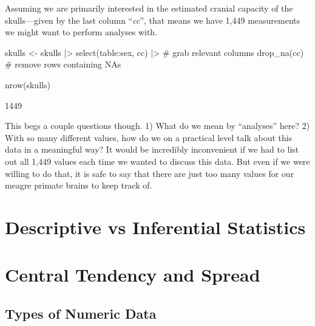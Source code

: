 

Assuming we are primarily interested in the estimated cranial capacity of the skulls—given by the last column ``\textit{cc}'', that means we have  1,449 measurements we might want to perform analyses with.

\begin{inR}
skulls <- skulls |> 
  select(table:sex, cc) |> # grab relevant columns
  drop_na(cc) # remove rows containing NAs
  
nrow(skulls)
\end{inR}

\begin{outR}
[1] 1449
\end{outR}

\noindent
This begs a couple questions though. 1) What do we mean by ``analyses'' here? 2) With so many different values, how do we on a practical level talk about this data in a meaningful way? It would be incredibly inconvenient if we had to list out all 1,449 values each time we wanted to discuss this data. But even if we were willing to do that, it is safe to say that there are just too many values for our meagre primate brains to keep track of.

\section{Descriptive vs Inferential Statistics}

\section{Central Tendency and Spread}

\subsection{Types of Numeric Data}